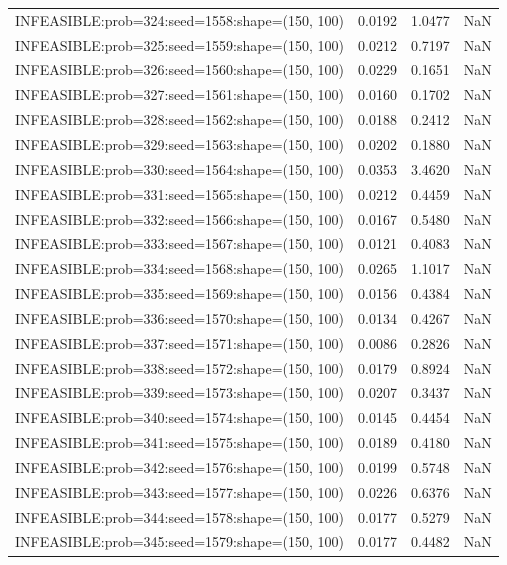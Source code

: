 \begin{longtable}{lccc}
INFEASIBLE:prob=324:seed=1558:shape=(150, 100) &   0.0192 &  1.0477 &    NaN \\
INFEASIBLE:prob=325:seed=1559:shape=(150, 100) &   0.0212 &  0.7197 &    NaN \\
INFEASIBLE:prob=326:seed=1560:shape=(150, 100) &   0.0229 &  0.1651 &    NaN \\
INFEASIBLE:prob=327:seed=1561:shape=(150, 100) &   0.0160 &  0.1702 &    NaN \\
INFEASIBLE:prob=328:seed=1562:shape=(150, 100) &   0.0188 &  0.2412 &    NaN \\
INFEASIBLE:prob=329:seed=1563:shape=(150, 100) &   0.0202 &  0.1880 &    NaN \\
INFEASIBLE:prob=330:seed=1564:shape=(150, 100) &   0.0353 &  3.4620 &    NaN \\
INFEASIBLE:prob=331:seed=1565:shape=(150, 100) &   0.0212 &  0.4459 &    NaN \\
INFEASIBLE:prob=332:seed=1566:shape=(150, 100) &   0.0167 &  0.5480 &    NaN \\
INFEASIBLE:prob=333:seed=1567:shape=(150, 100) &   0.0121 &  0.4083 &    NaN \\
INFEASIBLE:prob=334:seed=1568:shape=(150, 100) &   0.0265 &  1.1017 &    NaN \\
INFEASIBLE:prob=335:seed=1569:shape=(150, 100) &   0.0156 &  0.4384 &    NaN \\
INFEASIBLE:prob=336:seed=1570:shape=(150, 100) &   0.0134 &  0.4267 &    NaN \\
INFEASIBLE:prob=337:seed=1571:shape=(150, 100) &   0.0086 &  0.2826 &    NaN \\
INFEASIBLE:prob=338:seed=1572:shape=(150, 100) &   0.0179 &  0.8924 &    NaN \\
INFEASIBLE:prob=339:seed=1573:shape=(150, 100) &   0.0207 &  0.3437 &    NaN \\
INFEASIBLE:prob=340:seed=1574:shape=(150, 100) &   0.0145 &  0.4454 &    NaN \\
INFEASIBLE:prob=341:seed=1575:shape=(150, 100) &   0.0189 &  0.4180 &    NaN \\
INFEASIBLE:prob=342:seed=1576:shape=(150, 100) &   0.0199 &  0.5748 &    NaN \\
INFEASIBLE:prob=343:seed=1577:shape=(150, 100) &   0.0226 &  0.6376 &    NaN \\
INFEASIBLE:prob=344:seed=1578:shape=(150, 100) &   0.0177 &  0.5279 &    NaN \\
INFEASIBLE:prob=345:seed=1579:shape=(150, 100) &   0.0177 &  0.4482 &    NaN \\

\end{longtable}
